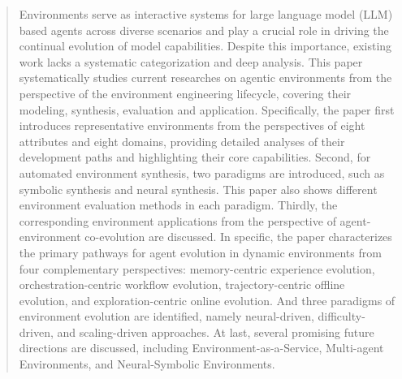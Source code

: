 \begin{abstract}
Environments serve as interactive systems for large language model (LLM) based agents across diverse scenarios and play a crucial role in driving the continual evolution of model capabilities. Despite this importance, existing work lacks a systematic categorization and deep analysis. This paper systematically studies current researches on agentic environments from the perspective of the environment engineering lifecycle, covering their modeling, synthesis, evaluation and application. Specifically, the paper first introduces representative environments from the perspectives of eight attributes and eight domains, providing detailed analyses of their development paths and highlighting their core capabilities.
Second, for automated environment synthesis, two paradigms are introduced, such as symbolic synthesis and neural synthesis. This paper also shows different environment evaluation methods in each paradigm. Thirdly, the corresponding environment applications from the perspective of agent-environment co-evolution are discussed. 
In specific, the paper characterizes the primary pathways for agent evolution in dynamic environments from four complementary perspectives: memory-centric experience evolution, orchestration-centric workflow evolution, trajectory-centric offline evolution, and exploration-centric online evolution.
And three paradigms of environment evolution are identified, namely neural-driven, difficulty-driven, and scaling-driven approaches. At last, several promising future directions are discussed, including Environment-as-a-Service, Multi-agent Environments, and Neural-Symbolic Environments.









\end{abstract}
